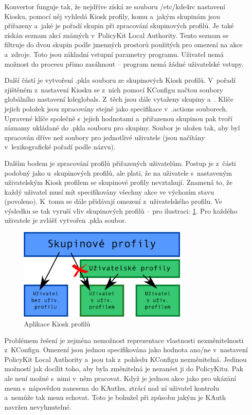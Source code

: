 Konvertor funguje tak, že nejdříve získá ze souboru /etc/kde4rc nastavení Kiosku, pomocí něj vyhledá Kiosk profily, komu a~jakým skupinám jsou přiřazeny a~jaké je pořadí skupin při zpracování skupinových profilů. Je také získán seznam akcí známých v~PolicyKit Local Authority. Tento seznam se filtruje do dvou skupin podle jmenných prostorů použitých pro omezení na akce a~zdroje. Toto jsou základní vstupní parametry programu. Uživatel nemá možnost do procesu přímo zasáhnout -- program nemá žádné uživatelské vstupy.

Další částí je vytvoření .pkla souboru ze skupinových Kiosk profilů. V~pořadí zjištěném z~nastavení Kiosku se z~nich pomocí KConfigu načtou soubory globálního nastavení kdeglobals. Z~těch jsou dále vytaženy skupiny  a~. Klíče jejich položek jsou zpracovány stejně jako specifikace v~.actions souborech. Upravené klíče společně s~jejich hodnotami a~přiřazenou skupinou pak tvoří záznamy ukládané do .pkla souboru pro skupiny. Soubor je uložen tak, aby byl zpracován dříve než soubory pro jednotlivé uživatele (jsou načítány v~lexikografické pořadí podle názvu).

Dalším bodem je zpracování profilů přiřazených uživatelům. Postup je z~části podobný jako u~skupinových profilů, ale platí, že na uživatele s~nastaveným uživatelským Kiosk profilem se skupinové profily nevztahují. Znamená to, že každý uživatel musí mít specifikovány všechny akce ve výchozím stavu (povoleno). K~tomu se dále přidávají omezení z~uživatelského profilu. Ve výsledku se tak vyruší vliv skupinových profilů -- pro ilustraci: \ref{fig:konv_profily}. Pro každého uživatele je zvlášť vytvořen .pkla soubor.

\begin{figure}[h]
    \centering
    \includegraphics[width=8.5cm]{obrazky/profily.pdf}
    \caption{Aplikace Kiosk profilů}
    \label{fig:konv_profily}
\end{figure}

Problémem řešení je zejména nemožnost reprezentace vlastnosti nezměnitelnosti z~KConfigu. Omezení jsou jednou specifikována jako hodnota ano/ne v~nastavení PolicyKit Local Authority a~jsou tak z~pohledu KConfigu nezměnitelná. Jedinou možností jak docílit toho, aby byla změnitelná je nezanést ji do PolicyKitu. Pak ale není možné s~nimi v~něm pracovat. Když je jednou akce jako  pro ukázání menu s~nápovědou zanesena do KAuthu, ztrácí nad ní uživatel kontrolu a~nemůže tak menu schovat. Toto je bohužel při způsobu jakým je KAuth navržen nevyhnutelné.


